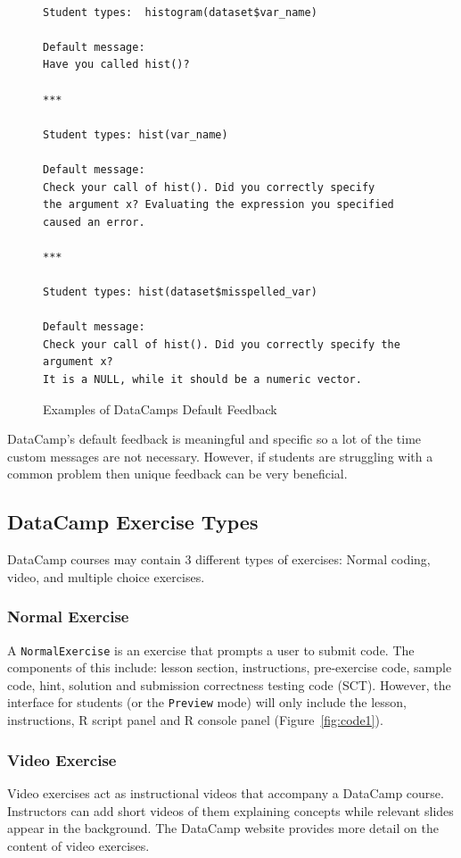 \documentclass[12pt]{article}\usepackage[]{graphicx}\usepackage[]{color}
\begin{document}
\begin{figure}
\caption{Examples of DataCamps Default Feedback}
\begin{Verbatim}

Student types:  histogram(dataset$var_name)

Default message:
Have you called hist()?

***

Student types: hist(var_name)

Default message:
Check your call of hist(). Did you correctly specify 
the argument x? Evaluating the expression you specified
caused an error.

***

Student types: hist(dataset$misspelled_var)

Default message:
Check your call of hist(). Did you correctly specify the
argument x? 
It is a NULL, while it should be a numeric vector.

\end{Verbatim}
\end{figure}
DataCamp's default feedback is meaningful and specific so a lot of the time custom 
messages are not necessary.
However, if students are struggling with a common problem then unique feedback can be very beneficial.

\subsection{DataCamp Exercise Types}
DataCamp courses may contain 3 different types of exercises: Normal coding, video, and multiple choice exercises.
\subsubsection{Normal Exercise}
A \texttt{NormalExercise} is an exercise that prompts a user to submit code. The components of this include: lesson section, instructions, pre-exercise code, sample code, hint, solution and submission correctness testing code (SCT). However, the interface for students (or the \texttt{Preview}
mode) will only include the lesson, instructions, R script panel and R console panel (Figure~\ref{fig:code1}).
\subsubsection{Video Exercise}
Video exercises act as instructional videos that accompany a DataCamp course. Instructors can add short videos of them explaining concepts while 
relevant slides appear in the background. The DataCamp website provides 
more detail on the content of video exercises. 
\end{document}

